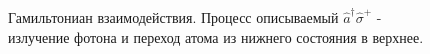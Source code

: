 \begin{figure}
\centering



\caption{Гамильтониан взаимодействия. Процесс описываемый $\hat{a}^{\dag}\hat{\sigma}^{+}$ - излучение
  фотона и переход атома из нижнего состояния в верхнее.}
\label{figPart1Ch2_2_4}
\end{figure}
